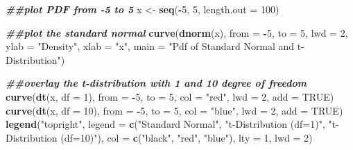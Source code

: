 \documentclass[
]{book}
\newenvironment{Shaded}{\begin{snugshade}}{\end{snugshade}}
\newcommand{\AttributeTok}[1]{\textcolor[rgb]{0.13,0.29,0.53}{#1}}
\newcommand{\ConstantTok}[1]{\textcolor[rgb]{0.56,0.35,0.01}{#1}}
\newcommand{\DecValTok}[1]{\textcolor[rgb]{0.00,0.00,0.81}{#1}}
\newcommand{\DocumentationTok}[1]{\textcolor[rgb]{0.56,0.35,0.01}{\textbf{\textit{#1}}}}
\newcommand{\FunctionTok}[1]{\textcolor[rgb]{0.13,0.29,0.53}{\textbf{#1}}}
\newcommand{\NormalTok}[1]{#1}
\newcommand{\OtherTok}[1]{\textcolor[rgb]{0.56,0.35,0.01}{#1}}
\newcommand{\SpecialCharTok}[1]{\textcolor[rgb]{0.81,0.36,0.00}{\textbf{#1}}}
\newcommand{\StringTok}[1]{\textcolor[rgb]{0.31,0.60,0.02}{#1}}
\begin{document}
\begin{Shaded}
\begin{Highlighting}[]
\DocumentationTok{\#\#plot PDF from {-}5 to 5}
\NormalTok{x }\OtherTok{\textless{}{-}} \FunctionTok{seq}\NormalTok{(}\SpecialCharTok{{-}}\DecValTok{5}\NormalTok{, }\DecValTok{5}\NormalTok{, }\AttributeTok{length.out =} \DecValTok{100}\NormalTok{)}

\DocumentationTok{\#\#plot the standard normal }
\FunctionTok{curve}\NormalTok{(}\FunctionTok{dnorm}\NormalTok{(x), }\AttributeTok{from =} \SpecialCharTok{{-}}\DecValTok{5}\NormalTok{, }\AttributeTok{to =} \DecValTok{5}\NormalTok{, }\AttributeTok{lwd =} \DecValTok{2}\NormalTok{,}
      \AttributeTok{ylab =} \StringTok{"Density"}\NormalTok{, }\AttributeTok{xlab =} \StringTok{"x"}\NormalTok{, }
      \AttributeTok{main =} \StringTok{"Pdf of Standard Normal and t{-}Distribution"}\NormalTok{)}

\DocumentationTok{\#\#overlay the t{-}distribution with 1 and 10 degree of freedom}
\FunctionTok{curve}\NormalTok{(}\FunctionTok{dt}\NormalTok{(x, }\AttributeTok{df =} \DecValTok{1}\NormalTok{), }\AttributeTok{from =} \SpecialCharTok{{-}}\DecValTok{5}\NormalTok{, }\AttributeTok{to =} \DecValTok{5}\NormalTok{, }\AttributeTok{col =} \StringTok{"red"}\NormalTok{, }\AttributeTok{lwd =} \DecValTok{2}\NormalTok{, }\AttributeTok{add =} \ConstantTok{TRUE}\NormalTok{)}
\FunctionTok{curve}\NormalTok{(}\FunctionTok{dt}\NormalTok{(x, }\AttributeTok{df =} \DecValTok{10}\NormalTok{), }\AttributeTok{from =} \SpecialCharTok{{-}}\DecValTok{5}\NormalTok{, }\AttributeTok{to =} \DecValTok{5}\NormalTok{, }\AttributeTok{col =} \StringTok{"blue"}\NormalTok{, }\AttributeTok{lwd =} \DecValTok{2}\NormalTok{, }\AttributeTok{add =} \ConstantTok{TRUE}\NormalTok{)}
\FunctionTok{legend}\NormalTok{(}\StringTok{"topright"}\NormalTok{, }\AttributeTok{legend =} \FunctionTok{c}\NormalTok{(}\StringTok{"Standard Normal"}\NormalTok{, }\StringTok{"t{-}Distribution (df=1)"}\NormalTok{, }\StringTok{"t{-}Distribution (df=10)"}\NormalTok{),}
       \AttributeTok{col =} \FunctionTok{c}\NormalTok{(}\StringTok{"black"}\NormalTok{, }\StringTok{"red"}\NormalTok{, }\StringTok{"blue"}\NormalTok{), }\AttributeTok{lty =} \DecValTok{1}\NormalTok{, }\AttributeTok{lwd =} \DecValTok{2}\NormalTok{)}
\end{Highlighting}
\end{Shaded}
\end{document}
